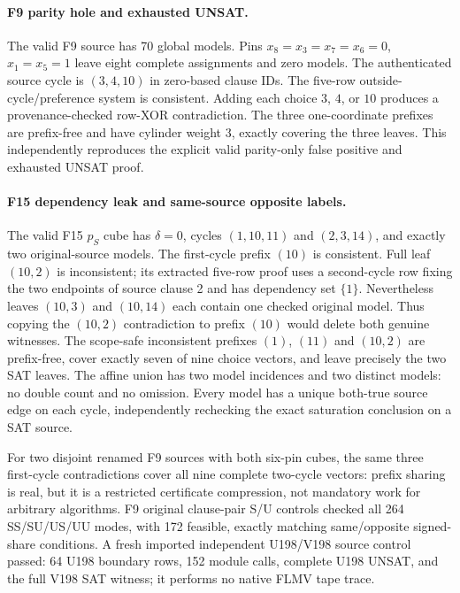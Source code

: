 \documentclass[11pt]{article}
\begin{document}
\paragraph{F9 parity hole and exhausted UNSAT.}
The valid F9 source has 70 global models. Pins
$x_8=x_3=x_7=x_6=0$, $x_1=x_5=1$ leave eight complete assignments and zero
models. The authenticated source cycle is $(3,4,10)$ in zero-based clause IDs.
The five-row outside-cycle/preference system is consistent. Adding each
choice $3$, $4$, or $10$ produces a provenance-checked row-XOR contradiction.
The three one-coordinate prefixes are prefix-free and have cylinder weight
$3$, exactly covering the three leaves. This independently reproduces the
explicit valid parity-only false positive and exhausted UNSAT proof.

\paragraph{F15 dependency leak and same-source opposite labels.}
The valid F15 $p_S$ cube has $\delta=0$, cycles
$(1,10,11)$ and $(2,3,14)$, and exactly two original-source models.
The first-cycle prefix $(10)$ is consistent. Full leaf $(10,2)$ is
inconsistent; its extracted five-row proof uses a second-cycle row fixing the
two endpoints of source clause 2 and has dependency set $\{1\}$.
Nevertheless leaves $(10,3)$ and $(10,14)$ each contain one checked original
model. Thus copying the $(10,2)$ contradiction to prefix $(10)$ would delete
both genuine witnesses. The scope-safe inconsistent prefixes
$(1)$, $(11)$ and $(10,2)$ are prefix-free, cover exactly seven of nine
choice vectors, and leave precisely the two SAT leaves. The affine union has
two model incidences and two distinct models: no double count and no omission.
Every model has a unique both-true source edge on each cycle, independently
rechecking the exact saturation conclusion on a SAT source.

For two disjoint renamed F9 sources with both six-pin cubes, the same three
first-cycle contradictions cover all nine complete two-cycle vectors: prefix
sharing is real, but it is a restricted certificate compression, not mandatory
work for arbitrary algorithms. F9 original clause-pair S/U controls checked
all 264 SS/SU/US/UU modes, with 172 feasible, exactly matching same/opposite
signed-share conditions. A fresh imported independent U198/V198 source
control passed: 64 U198 boundary rows, 152 module calls, complete U198 UNSAT,
and the full V198 SAT witness; it performs no native FLMV tape trace.
\end{document}
